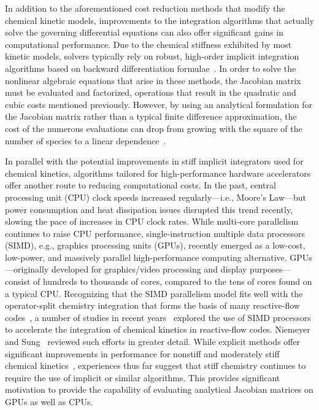 \documentclass[preprint,12pt]{elsarticle}
\begin{document}
In addition to the aforementioned cost reduction methods that modify the chemical kinetic models, improvements to the integration algorithms that actually solve the governing differential equations can also offer significant gains in computational performance.
Due to the chemical stiffness exhibited by most kinetic models, solvers typically rely on robust, high-order implicit integration algorithms based on backward differentiation formulae~\cite{Curtiss:1952,Byrne:1987wp,Brown:1989vl,Hindmarsh:2005hg}.
In order to solve the nonlinear algebraic equations that arise in these methods, the Jacobian matrix must be evaluated and factorized, operations that result in the quadratic and cubic costs mentioned previously.
However, by using an analytical formulation for the Jacobian matrix rather than a typical finite difference approximation, the cost of the numerous evaluations can drop from growing with the square of the number of species to a linear dependence~\cite{Lu:2009gh}.

In parallel with the potential improvements in stiff implicit integrators used for chemical kinetics, algorithms tailored for high-performance hardware accelerators offer another route to reducing computational costs.
In the past, central processing unit (CPU) clock speeds increased regularly---i.e., Moore's Law---but power consumption and heat dissipation issues disrupted this trend recently, slowing the pace of increases in CPU clock rates.
While multi-core parallelism continues to raise CPU performance, single-instruction multiple data processors (SIMD), e.g., graphics processing units (GPUs), recently emerged as a low-cost, low-power, and massively parallel high-performance computing alternative.
GPUs---originally developed for graphics\slash video processing and display purposes---consist of hundreds to thousands of cores, compared to the tens of cores found on a typical CPU.
Recognizing that the SIMD parallelism model fits well with the operator-split chemistry integration that forms the basis of many reactive-flow codes~\cite{Oran:2001aa}, a number of studies in recent years~\cite{Spafford:2010aa,Shi:2011aa,Niemeyer:2011aa,Shi:2012aa,Stone:2013aa,Niemeyer:2014aa} explored the use of SIMD processors to accelerate the integration of chemical kinetics in reactive-flow codes.
Niemeyer and Sung~\cite{Niemeyer:2014ab} reviewed such efforts in greater detail.
While explicit methods offer significant improvements in performance for nonstiff and moderately stiff chemical kinetics~\cite{Niemeyer:2014aa}, experiences thus far suggest that stiff chemistry continues to require the use of implicit or similar algorithms.
This provides significant motivation to provide the capability of evaluating analytical Jacobian matrices on GPUs as well as CPUs.
\end{document}
